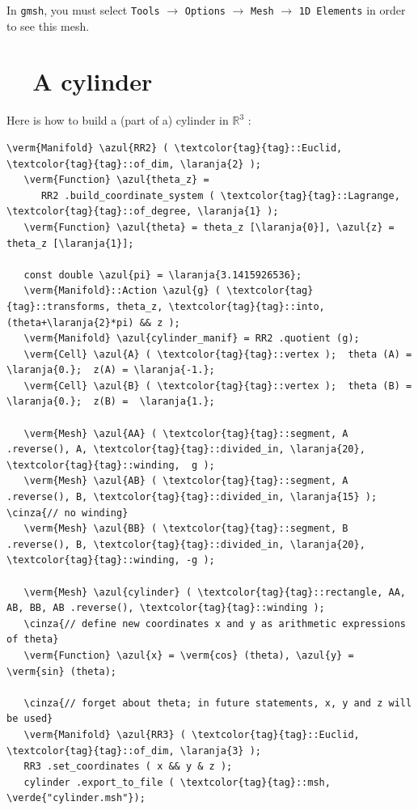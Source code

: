 In {\tt gmsh}, you must select {\small\tt Tools} $\to$ {\small\tt Options} $\to$
{\small\tt Mesh} $\to$ {\small\tt 1D Elements} in order to see this mesh.


\section{~~A cylinder}\label{\numb section 7.\numb parag 3}

Here is how to build a (part of a) cylinder in $ \mathbb{R}^3 $ :

\begin{Verbatim}[commandchars=\\\{\},formatcom=\small\tt,frame=single,
   label=parag-\ref{\numb section 7.\numb parag 3}.cpp,rulecolor=\color{moldura},
   baselinestretch=0.94,framesep=2mm                                            ]
   \verm{Manifold} \azul{RR2} ( \textcolor{tag}{tag}::Euclid, \textcolor{tag}{tag}::of_dim, \laranja{2} );
   \verm{Function} \azul{theta_z} =
      RR2 .build_coordinate_system ( \textcolor{tag}{tag}::Lagrange, \textcolor{tag}{tag}::of_degree, \laranja{1} );
   \verm{Function} \azul{theta} = theta_z [\laranja{0}], \azul{z} = theta_z [\laranja{1}];

   const double \azul{pi} = \laranja{3.1415926536};
   \verm{Manifold}::Action \azul{g} ( \textcolor{tag}{tag}::transforms, theta_z, \textcolor{tag}{tag}::into, (theta+\laranja{2}*pi) && z );
   \verm{Manifold} \azul{cylinder_manif} = RR2 .quotient (g);
   \verm{Cell} \azul{A} ( \textcolor{tag}{tag}::vertex );  theta (A) = \laranja{0.};  z(A) = \laranja{-1.};
   \verm{Cell} \azul{B} ( \textcolor{tag}{tag}::vertex );  theta (B) = \laranja{0.};  z(B) =  \laranja{1.};

   \verm{Mesh} \azul{AA} ( \textcolor{tag}{tag}::segment, A .reverse(), A, \textcolor{tag}{tag}::divided_in, \laranja{20}, \textcolor{tag}{tag}::winding,  g );
   \verm{Mesh} \azul{AB} ( \textcolor{tag}{tag}::segment, A .reverse(), B, \textcolor{tag}{tag}::divided_in, \laranja{15} );  \cinza{// no winding}
   \verm{Mesh} \azul{BB} ( \textcolor{tag}{tag}::segment, B .reverse(), B, \textcolor{tag}{tag}::divided_in, \laranja{20}, \textcolor{tag}{tag}::winding, -g );

   \verm{Mesh} \azul{cylinder} ( \textcolor{tag}{tag}::rectangle, AA, AB, BB, AB .reverse(), \textcolor{tag}{tag}::winding );
   \cinza{// define new coordinates x and y as arithmetic expressions of theta}
   \verm{Function} \azul{x} = \verm{cos} (theta), \azul{y} = \verm{sin} (theta);

   \cinza{// forget about theta; in future statements, x, y and z will be used}
   \verm{Manifold} \azul{RR3} ( \textcolor{tag}{tag}::Euclid, \textcolor{tag}{tag}::of_dim, \laranja{3} );
   RR3 .set_coordinates ( x && y & z );
   cylinder .export_to_file ( \textcolor{tag}{tag}::msh, \verde{"cylinder.msh"});
\end{Verbatim}

